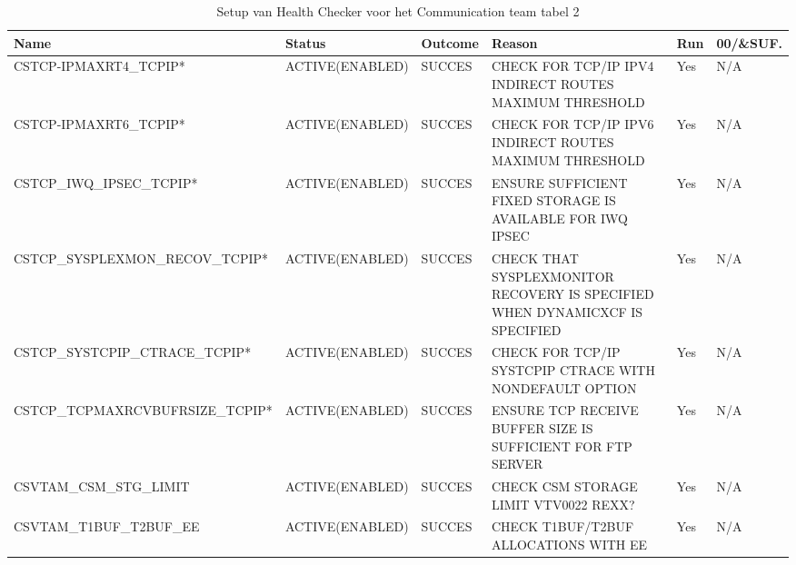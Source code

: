 \begin{landscape}
	\begin{table}[h]
		\begin{tabular}{|l|l|l|p{4.5cm}|l|l|}
			\hline
			\textbf{Name}                       & \textbf{Status}   & \textbf{Outcome} & \textbf{Reason}                                                                                      & \textbf{Run} & \textbf{00/\&SUF.} \\ \hline
			CSTCP-IPMAXRT4\_TCPIP*           & ACTIVE(ENABLED)  & SUCCES & CHECK   FOR TCP/IP IPV4 INDIRECT ROUTES    MAXIMUM   THRESHOLD                      & Yes & N/A \\ \hline
			CSTCP-IPMAXRT6\_TCPIP*           & ACTIVE(ENABLED)  & SUCCES & CHECK   FOR TCP/IP IPV6 INDIRECT ROUTES    MAXIMUM   THRESHOLD                      & Yes & N/A \\ \hline
			CSTCP\_IWQ\_IPSEC\_TCPIP*        & ACTIVE(ENABLED)  & SUCCES & ENSURE SUFFICIENT FIXED STORAGE IS   AVAILABLE FOR IWQ IPSEC                        & Yes & N/A \\ \hline
			CSTCP\_SYSPLEXMON\_RECOV\_TCPIP* & ACTIVE(ENABLED)  & SUCCES & CHECK   THAT SYSPLEXMONITOR RECOVERY IS    SPECIFIED   WHEN DYNAMICXCF IS SPECIFIED & Yes & N/A \\ \hline
			CSTCP\_SYSTCPIP\_CTRACE\_TCPIP*  & ACTIVE(ENABLED)  & SUCCES & CHECK   FOR TCP/IP SYSTCPIP CTRACE WITH   NONDEFAULT   OPTION                       & Yes & N/A \\ \hline
			CSTCP\_TCPMAXRCVBUFRSIZE\_TCPIP* & ACTIVE(ENABLED)  & SUCCES & ENSURE   TCP RECEIVE BUFFER SIZE IS    SUFFICIENT   FOR FTP SERVER                  & Yes & N/A \\ \hline
			CSVTAM\_CSM\_STG\_LIMIT          & ACTIVE(ENABLED)  & SUCCES & CHECK CSM STORAGE LIMIT    VTV0022 REXX?                                            & Yes & N/A \\ \hline
			CSVTAM\_T1BUF\_T2BUF\_EE         & ACTIVE(ENABLED)  & SUCCES & CHECK   T1BUF/T2BUF ALLOCATIONS WITH EE                                             & Yes & N/A \\ \hline
		\end{tabular}
		\caption[Health Checker Communication team tabel 2]{Setup van Health Checker voor het Communication team tabel 2}
		\label{tbl:Communication Team Tabel 2}
	\end{table}
\end{landscape}

